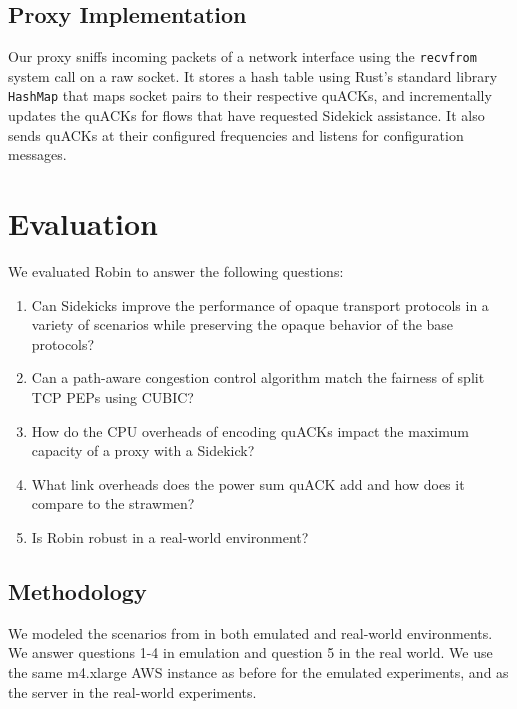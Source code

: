 \subsection{Proxy Implementation}
\label{sec:sidekick:implementation:proxy}

Our proxy sniffs incoming packets of a network interface using the
\texttt{recvfrom} system call on a raw socket.
It stores a hash table using Rust's standard library \texttt{HashMap} that maps
socket pairs to their respective quACKs, and
incrementally updates the quACKs for flows that have requested Sidekick assistance.
It also sends quACKs at their configured frequencies and listens for
configuration messages.

\section{Evaluation}
\label{sec:sidekick:evaluation}




We evaluated Robin to answer the following questions:
\begin{enumerate}[noitemsep,topsep=0pt]
	\item Can Sidekicks improve the performance of opaque transport protocols
	in a variety of scenarios while preserving the opaque behavior of the
	base protocols?
	\item Can a path-aware congestion control algorithm match the fairness of
	split TCP PEPs using CUBIC?
	\item How do the CPU overheads of encoding quACKs impact the maximum
	capacity of a proxy with a Sidekick?
	\item What link overheads does the power sum quACK add and how does it
	compare to the strawmen?
	\item Is Robin robust in a real-world environment?
\end{enumerate}

\subsection{Methodology}
\label{sec:sidekick:evaluation:methodology}

We modeled the scenarios from  in both
emulated and real-world environments. We answer questions 1-4 in emulation
and question 5 in the real world. We use the same m4.xlarge AWS instance
as before for the emulated experiments, and as the server in the real-world
experiments.

